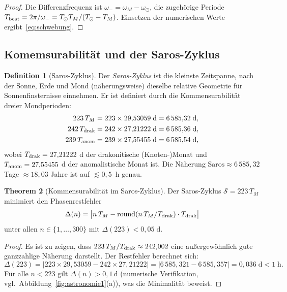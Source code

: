 ﻿\documentclass[12pt, a4paper]{article}
\theoremstyle{definition}
\newtheorem{theorem}{Theorem}[section]
\newtheorem{definition}[theorem]{Definition}
\begin{document}
\begin{proof}
Die Differenzfrequenz ist $\omega_- = \omega_M - \omega_{\odot}$, die zugehörige
Periode $T_{\rm beat} = 2\pi/\omega_- = T_{\odot}T_M/(T_{\odot}-T_M)$. Einsetzen
der numerischen Werte ergibt~\eqref{eq:schwebung}. \hfill
\end{proof}

\subsection{Komemsurabilität und der Saros-Zyklus}

\begin{definition}[Saros-Zyklus]\label{def:saros}
Der \emph{Saros-Zyklus} ist die kleinste Zeitspanne, nach der Sonne, Erde und
Mond (näherungsweise) dieselbe relative Geometrie für Sonnenfinsternisse einnehmen.
Er ist definiert durch die Kommensurabilität dreier Mondperioden:
\begin{align}
  223\,T_M &= 223 \times 29{,}53059\;\text{d} = 6\,585{,}32\;\text{d}, \label{eq:saros1}\\
  242\,T_{\rm drak} &= 242 \times 27{,}21222\;\text{d} = 6\,585{,}36\;\text{d}, \label{eq:saros2}\\
  239\,T_{\rm anom} &= 239 \times 27{,}55455\;\text{d} = 6\,585{,}54\;\text{d}, \label{eq:saros3}
\end{align}
wobei $T_{\rm drak} = 27{,}21222$ d der drakonitische (Knoten-)Monat und
$T_{\rm anom} = 27{,}55455$ d der anomalistische Monat ist. Die Näherung
$\text{Saros} \approx 6\,585{,}32$ Tage $\approx 18{,}03$ Jahre ist auf
$\lesssim 0{,}5\,$ h genau.
\end{definition}

\begin{theorem}[Kommensurabilität im Saros-Zyklus]\label{thm:saros}
Der Saros-Zyklus $\mathcal{S} = 223\,T_M$ minimiert den Phasenrestfehler
\begin{equation}\label{eq:phasenrest}
  \Delta(n) = \bigl|n\,T_M - \mathrm{round}(n\,T_M / T_{\rm drak})\cdot T_{\rm drak}\bigr|
\end{equation}
unter allen $n \in \{1, \ldots, 300\}$ mit $\Delta(223) < 0{,}05\;\text{d}$.
\end{theorem}

\begin{proof}
Es ist zu zeigen, dass $223\,T_M / T_{\rm drak} \approx 242{,}002$ eine
außergewöhnlich gute ganzzahlige Näherung darstellt. Der Restfehler berechnet
sich:
\[
  \Delta(223) = |223 \times 29{,}53059 - 242 \times 27{,}21222|
  = |6\,585{,}321 - 6\,585{,}357| = 0{,}036\;\text{d} < 1\;\text{h}.
\]
Für alle $n < 223$ gilt $\Delta(n) > 0{,}1\,\text{d}$ (numerische Verifikation,
vgl.\ Abbildung~\ref{fig:astronomie1}(a)), was die Minimalität beweist. \hfill
\end{proof}
\end{document}

